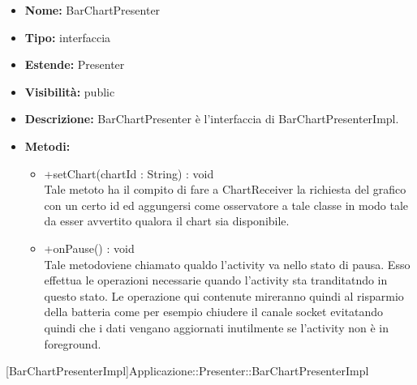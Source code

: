 			
			\begin{itemize}
			\item \textbf{Nome:} BarChartPresenter
			\item \textbf{Tipo:} interfaccia
			
		\item \textbf{Estende:}
		Presenter
			\item \textbf{Visibilità:} public
			\item \textbf{Descrizione:} BarChartPresenter è l'interfaccia di BarChartPresenterImpl.
			\item \textbf{Metodi:}
				\begin{itemize}
				\setlength{\itemsep}{5pt}
				
					\item[\ding{111}] {{+setChart(chartId : String) : void}} \\ [1mm] Tale metoto ha il compito di fare a ChartReceiver la richiesta del grafico con un certo id ed aggungersi come osservatore a tale classe in modo tale da esser avvertito qualora il chart sia disponibile.
					\item[\ding{111}] {{+onPause() : void}} \\ [1mm] Tale metodoviene chiamato qualdo l'activity va nello stato di pausa. Esso effettua le operazioni necessarie quando l'activity sta tranditatndo in questo stato. Le operazione qui contenute mireranno quindi al risparmio della batteria come per esempio chiudere il canale socket evitatando quindi che i dati vengano aggiornati inutilmente se l'activity non è in foreground.
				\end{itemize}
		
			\end{itemize}

			
			[BarChartPresenterImpl]{Applicazione::Presenter::BarChartPresenterImpl}
			

	
